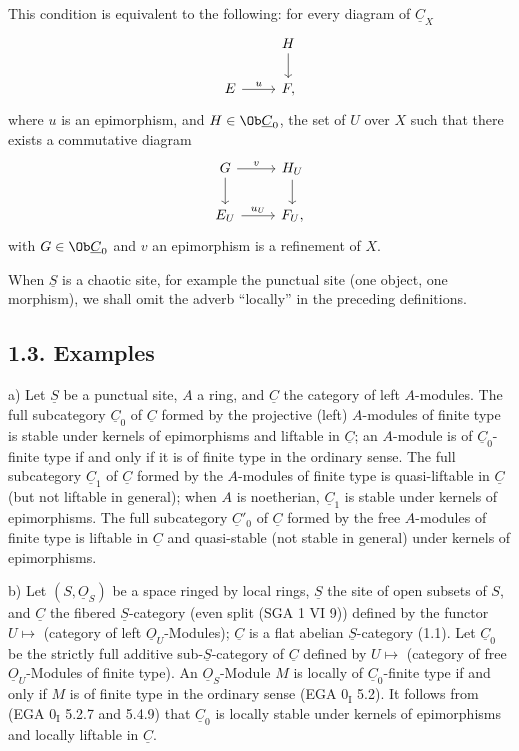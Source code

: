 This condition is equivalent to the following: for every diagram of \(\underline{C}_X\)
\[
\begin{tikzcd}
& H \arrow[d]\\
E \arrow[r,"u"] & F ,
\end{tikzcd}
\]
where \(u\) is an epimorphism, and \(H\in\Ob\underline{C}_0\), the set of \(U\) over \(X\) such that there exists a commutative diagram
\[
\begin{tikzcd}
G \arrow[r,"v"] \arrow[d] & H_U \arrow[d]\\
E_U \arrow[r,"u_U"] & F_U ,
\end{tikzcd}
\]
with \(G\in\Ob\underline{C}_0\) and \(v\) an epimorphism is a refinement of \(X\).

When \(\underline{S}\) is a chaotic site, for example the punctual site (one object, one morphism), we shall omit the adverb ``locally'' in the preceding definitions.

\subsection*{1.3. Examples}

a) Let \(\underline{S}\) be a punctual site, \(A\) a ring, and \(\underline{C}\) the category of left \(A\)-modules. The full subcategory \(\underline{C}_0\) of \(\underline{C}\) formed by the projective (left) \(A\)-modules of finite type is stable under kernels of epimorphisms and liftable in \(\underline{C}\); an \(A\)-module is of \(\underline{C}_0\)-finite type if and only if it is of finite type in the
%
ordinary sense. The full subcategory \(\underline{C}_1\) of \(\underline{C}\) formed by the \(A\)-modules of finite type is quasi-liftable in \(\underline{C}\) (but not liftable in general); when \(A\) is noetherian, \(\underline{C}_1\) is stable under kernels of epimorphisms. The full subcategory \(\underline{C}'_0\) of \(\underline{C}\) formed by the free \(A\)-modules of finite type is liftable in \(\underline{C}\) and quasi-stable (not stable in general) under kernels of epimorphisms.

b) Let \((S,\underline{O}_S)\) be a space ringed by local rings, \(\underline{S}\) the site of open subsets of \(S\), and \(\underline{C}\) the fibered \(\underline{S}\)-category (even split (SGA 1 VI 9)) defined by the functor \(U\longmapsto\) (category of left \(\underline{O}_U\)-Modules); \(\underline{C}\) is a flat abelian \(\underline{S}\)-category (1.1). Let \(\underline{C}_0\) be the strictly full additive sub-\(\underline{S}\)-category of \(\underline{C}\) defined by \(U\longmapsto\) (category of free \(\underline{O}_U\)-Modules of finite type). An \(\underline{O}_S\)-Module \(M\) is locally of \(\underline{C}_0\)-finite type if and only if \(M\) is of finite type in the ordinary sense (EGA \(0_{\mathrm I}\) 5.2). It follows from (EGA \(0_{\mathrm I}\) 5.2.7 and 5.4.9) that \(\underline{C}_0\) is locally stable under kernels of epimorphisms and locally liftable in \(\underline{C}\).

